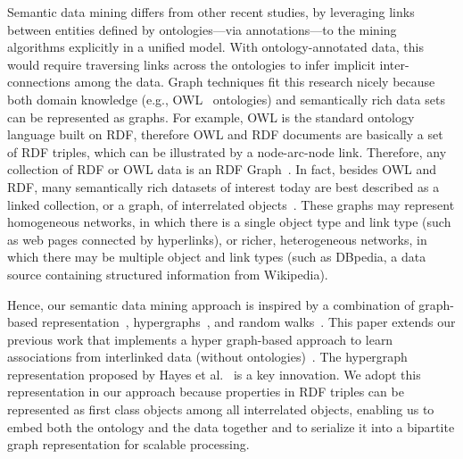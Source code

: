 Semantic data mining differs from other recent studies, by leveraging links between entities defined by ontologies---via annotations---to the mining algorithms explicitly in a unified model.  With ontology-annotated data, this would require traversing links across the ontologies to infer implicit inter-connections among the data. Graph techniques fit this research nicely because both domain knowledge (e.g., OWL~\cite{OWL} ontologies) and semantically rich data sets can be represented as graphs. For example, OWL is the standard ontology language built on RDF, therefore OWL and RDF documents are basically a set of RDF triples, which can be illustrated by a node-arc-node link. Therefore, any collection of RDF or OWL data is an RDF Graph~\cite{GraphModelRDF}. In fact, besides OWL and RDF, many semantically rich datasets of interest today are best described as a linked collection, or a graph, of interrelated objects~\cite{LinkMiningGetoor}. These graphs may represent homogeneous networks, in which there is a single object type and link type (such as web pages connected by hyperlinks), or richer, heterogeneous networks, in which there may be multiple object and link types (such as DBpedia, a data source containing structured information from Wikipedia).


Hence, our semantic data mining approach is inspired by a combination of graph-based representation~\cite{CheinMugnier08}, hypergraphs~\cite{Zhou06learningwith,Tian09}, and random walks~\cite{Fouss06random-walkcomputation,Pan,Yen05clusteringusing,Zhou:2009:GCB:1687627.1687709}. This paper extends our previous work that implements a hyper graph-based approach to learn associations from interlinked data (without ontologies)~\cite{LiuEtal11}. The hypergraph representation proposed by Hayes et al.~\cite{GraphModelRDF} is a key innovation. We adopt this representation in our approach because properties in RDF triples can be represented as first class objects among all interrelated objects, enabling us to embed both the ontology and the data together and to serialize it into a bipartite graph representation for scalable processing.

